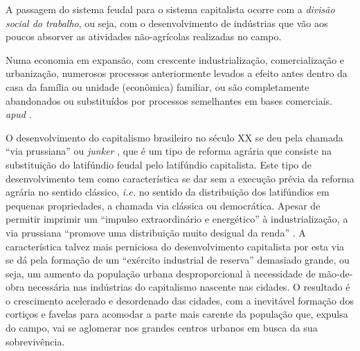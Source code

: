 \documentclass[
	12pt,				%
	oneside,			%
	a4paper,			%
	chapter=TITLE,		%
	section=TITLE,		%
	english,			%
	brazil				%
	]{abntex2}
\begin{document}
A passagem do sistema feudal para o sistema capitalista ocorre com a \emph{divisão
social do trabalho}, ou seja, com o desenvolvimento de indústrias que vão aos
poucos absorver as atividades não-agrícolas realizadas no campo.
\begin{citacao}
Numa economia em expansão, com crescente industrialização, comercialização e
urbanização, numerosos processos anteriormente levados a efeito antes dentro da
casa da família ou unidade (econômica) familiar, ou são completamente
abandonados ou substituídos por processos semelhantes em bases
comerciais. \cite[p. 41]{kuznets} \textit{apud} \cite[p. 218]{rangel1956}.
\end{citacao}
O desenvolvimento do capitalismo brasileiro no século XX se deu pela chamada
``via prussiana'' ou \emph{junker} \autocite[155]{rangel1988}, que é um tipo de reforma agrária
que consiste na substituição do latifúndio feudal pelo latifúndio capitalista.
Este tipo de desenvolvimento tem como característica se dar sem a execução
prévia da reforma agrária no sentido clássico, \emph{i.e.} no sentido da distribuição
dos latifúndios em pequenas propriedades, a chamada via clássica ou democrática.
Apesar de permitir imprimir um ``impulso extraordinário e energético'' à
industrialização, a via prussiana ``promove uma distribuição muito desigual da
renda'' \autocite[155]{rangel1988}. A característica talvez mais perniciosa do
desenvolvimento capitalista por esta via se dá pela formação de um ``exército
industrial de reserva'' demasiado grande, ou seja, um aumento da população urbana
desproporcional à necessidade de mão-de-obra necessária nas indústrias do
capitalismo nascente nas cidades. O resultado é o crescimento acelerado e
desordenado das cidades, com a inevitável formação dos cortiços e favelas para
acomodar a parte mais carente da população que, expulsa do campo, vai se
aglomerar nos grandes centros urbanos em busca da sua sobrevivência.
\end{document}

